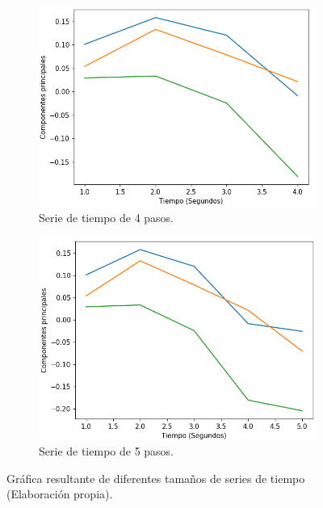 \begin{figure}[H]
{\begin{varwidth}{\textwidth}
        \begin{subfigure}[h]{0.45\textwidth} 
            \includegraphics[width=\textwidth]{imagenes/Cap4/pca3-4}
            \caption{Serie de tiempo de 4 pasos.}
            \label{fig:pasos4}
        \end{subfigure}       
        \begin{subfigure}[h]{0.45\textwidth} 
            \includegraphics[width=\textwidth]{imagenes/Cap4/pca3-5}
            \caption{Serie de tiempo de 5 pasos.}
            \label{fig:pasos5}
        \end{subfigure}
        \end{varwidth}}
        \caption{Gr\'{a}fica resultante de diferentes tama\~{n}os de series de tiempo (Elaboraci\'{o}n propia).}
        
		\label{fig:series-de-tiempo}
    \end{figure}
